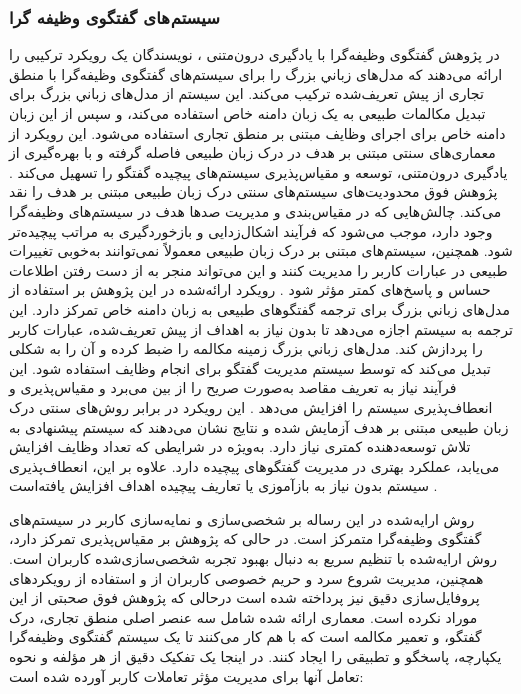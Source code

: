 \subsubsection{سیستم های گفتگوی وظیفه گرا}
در پژوهش گفتگوی وظیفه‌گرا با یادگیری درون‌متنی%
\cite{bocklisch2024task}
، نویسندگان یک رویکرد ترکیبی را ارائه می‌دهند که مدل‌های زباني بزرگ را برای سیستم‌های گفتگوی وظیفه‌گرا با 
منطق تجاری%
 از پیش‌ تعریف‌شده ترکیب می‌کند. این سیستم از مدل‌های زباني بزرگ برای تبدیل مکالمات طبیعی به یک  
زبان دامنه خاص%
 استفاده می‌کند، و سپس از این زبان دامنه خاص برای اجرای وظایف مبتنی بر منطق تجاری استفاده می‌شود. این رویکرد از معماری‌های سنتی مبتنی بر هدف در درک زبان طبیعی فاصله گرفته و با بهره‌گیری از یادگیری درون‌متنی، توسعه و مقیاس‌پذیری سیستم‌های پیچیده گفتگو را تسهیل می‌کند .
\newline
پژوهش فوق محدودیت‌های سیستم‌های سنتی درک زبان طبیعی مبتنی بر هدف را نقد می‌کند. چالش‌هایی که در مقیاس‌بندی و مدیریت صدها هدف در سیستم‌های وظیفه‌گرا وجود دارد، موجب می‌شود که فرآیند اشکال‌زدایی و بازخوردگیری به مراتب پیچیده‌تر شود. همچنین، سیستم‌های مبتنی بر درک زبان طبیعی معمولاً نمی‌توانند به‌خوبی تغییرات طبیعی در عبارات کاربر را مدیریت کنند و این می‌تواند منجر به از دست رفتن اطلاعات حساس و پاسخ‌های کمتر مؤثر شود .
\newline
رویکرد ارائه‌شده در این پژوهش بر استفاده از مدل‌های زباني بزرگ برای ترجمه گفتگوهای طبیعی به زبان دامنه خاص تمرکز دارد. این ترجمه به سیستم اجازه می‌دهد تا بدون نیاز به اهداف از پیش‌ تعریف‌شده، عبارات کاربر را پردازش کند. مدل‌های زباني بزرگ زمینه مکالمه را ضبط کرده و آن را به شکلی تبدیل می‌کند که توسط سیستم مدیریت گفتگو برای انجام وظایف استفاده شود. این فرآیند نیاز به تعریف مقاصد به‌صورت صریح را از بین می‌برد و مقیاس‌پذیری و انعطاف‌پذیری سیستم را افزایش می‌دهد .
\newline
این رویکرد در برابر روش‌های سنتی درک زبان طبیعی مبتنی بر هدف آزمایش شده و نتایج نشان می‌دهند که سیستم پیشنهادی به تلاش توسعه‌دهنده کمتری نیاز دارد. به‌ویژه در شرایطی که تعداد وظایف افزایش می‌یابد، عملکرد بهتری در مدیریت گفتگوهای پیچیده دارد. علاوه بر این، انعطاف‌پذیری سیستم بدون نیاز به بازآموزی یا تعاریف پیچیده اهداف افزایش یافته‌است .

روش ارایه‌شده در این رساله بر شخصی‌سازی و نمایه‌سازی کاربر در سیستم‌های گفتگوی وظیفه‌گرا متمرکز است. در حالی که پژوهش%
\cite{bocklisch2024task}
 بر مقیاس‌پذیری تمرکز دارد، روش ارايه‌شده با تنظیم سریع به دنبال بهبود تجربه شخصی‌سازی‌شده کاربران است. همچنین، مدیریت شروع سرد و حریم خصوصی کاربران از و استفاده از رویکردهای پروفایل‌سازی دقیق نیز پرداخته شده است درحالی که پژوهش فوق صحبتی از این موراد نکرده است.
\newline
معماری ارائه شده شامل سه عنصر اصلی منطق تجاری، درک گفتگو، و تعمیر مکالمه است که با هم کار می‌کنند تا یک سیستم گفتگوی وظیفه‌گرا یکپارچه، پاسخگو و تطبیقی ​​را ایجاد کنند. در اینجا یک تفکیک دقیق از هر مؤلفه و نحوه تعامل آنها برای مدیریت مؤثر تعاملات کاربر آورده شده است:

